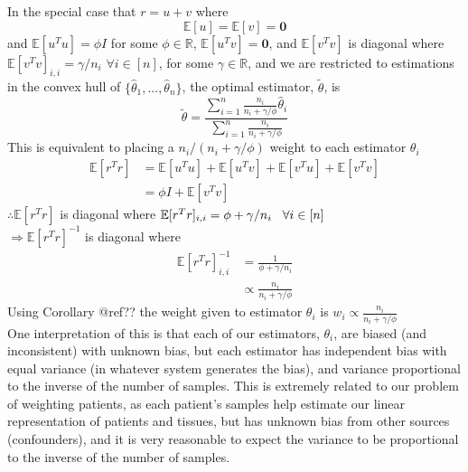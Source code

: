 \documentclass{article}
\newcommand{\hs}[1]{\hspace*{#1 cm}}
\begin{document}
\corollary In the special case that $r = u + v$ where
\[ \mathbb{E}[u] = \mathbb{E}[v] = \mathbf{0} \]
and $\mathbb{E}[u^Tu] = \phi I$ for some $\phi \in \mathbb{R}$, $\mathbb{E}[u^Tv]=\mathbf{0}$, and $\mathbb{E}[v^Tv]$ is diagonal where $\mathbb{E}[v^Tv]_{i,i} = \gamma/n_i$ $\forall i \in [n]$, for some $\gamma \in \mathbb{R}$, and we are restricted to estimations in the convex hull of $\{\hat{\theta}_1,...,\hat{\theta}_n\}$, the optimal estimator, $\tilde{\theta}$, is
\[ \tilde{\theta} = \frac{\sum_{i=1}^n \frac{n_i}{n_i+\gamma/\phi}\hat{\theta}_i}{\sum_{i=1}^n \frac{n_i}{n_i+\gamma/\phi}} \]
\remark This is equivalent to placing a $n_i/(n_i+\gamma/\phi)$ weight to each estimator $\theta_i$
\proof
\begin{align*}
\mathbb{E}[r^Tr] &= \mathbb{E}[u^Tu] + \mathbb{E}[u^Tv] + \mathbb{E}[v^Tu] + \mathbb{E}[v^Tv]
\\&= \phi I + \mathbb{E}[v^Tv]
\end{align*}
$\therefore \mathbb{E}[r^Tr]$ is diagonal where $\mathbb{E}[r^Tr]_{i,i} = \phi + \gamma/n_i \hs{.3}\forall i \in [n]$ \\
$\Rightarrow \mathbb{E}[r^Tr]^{-1}$ is diagonal where 
\begin{align*}
\mathbb{E}[r^Tr]^{-1}_{i,i} &= \frac{1}{\phi+\gamma/n_i}
\\&\propto \frac{n_i}{n_i+\gamma/\phi}
\end{align*}
Using Corollary @ref?? the weight given to estimator $\theta_i$ is $w_i \propto \frac{n_i}{n_i+\gamma/\phi}$ \\
One interpretation of this is that each of our estimators, $\theta_i$, are biased (and inconsistent) with unknown bias, but each estimator has independent bias with equal variance (in whatever system generates the bias), and variance proportional to the inverse of the number of samples. This is extremely related to our problem of weighting patients, as each patient's samples help estimate our linear representation of patients and tissues, but has unknown bias from other sources (confounders), and it is very reasonable to expect the variance to be proportional to the inverse of the number of samples.












%
\end{document}
